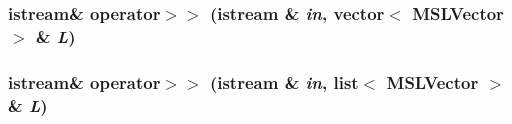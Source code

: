 \subsubsection{\setlength{\rightskip}{0pt plus 5cm}istream\& operator$>$$>$ (istream \& {\em in}, vector$<$ {\bf MSLVector} $>$ \& {\em L})}\label{vector_C_a4}


\subsubsection{\setlength{\rightskip}{0pt plus 5cm}istream\& operator$>$$>$ (istream \& {\em in}, list$<$ {\bf MSLVector} $>$ \& {\em L})}\label{vector_C_a2}


